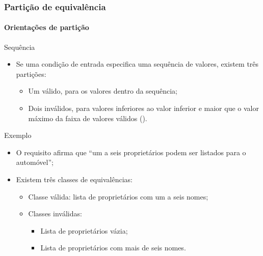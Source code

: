 \begin{frame}
\frametitle{Partição de equivalência}
\framesubtitle{Orientações de partição}

\begin{block:fact}{Sequência}
\begin{itemize}
	\item Se uma condição de entrada especifica uma sequência de valores,
	existem três partições:
	\begin{itemize}
		\item Um válido, para os valores dentro da sequência;

		\item Dois inválidos, para valores inferiores ao valor inferior e maior
		que o valor máximo da faixa de valores válidos ().
	\end{itemize}
\end{itemize}
\end{block:fact}


\begin{block}{Exemplo}
\begin{itemize}
	\item O requisito afirma que ``um a seis proprietários podem ser listados
	para o automóvel'';

	\item Existem três classes de equivalências:
	\begin{itemize}
		\item Classe válida: lista de proprietários com um a seis nomes;
		\item Classes inválidas:
		\begin{itemize}
			\item Lista de proprietários vázia;
			\item Lista de proprietários com mais de seis nomes.
		\end{itemize}
	\end{itemize}
\end{itemize}
\end{block}
\end{frame}



